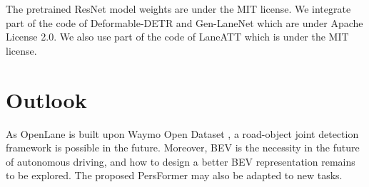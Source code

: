 \documentclass[runningheads]{llncs}
\begin{document}
The pretrained ResNet model weights are under the MIT license. We integrate part of the code of Deformable-DETR \cite{zhu2021deformable} and Gen-LaneNet \cite{guo2020gen} which are under Apache License 2.0. We also use part of the code of LaneATT \cite{tabelini2021keep} which is under the MIT license.

\section{Outlook}


As OpenLane is built upon Waymo Open Dataset \cite{sun2020scalability}, a road-object joint detection framework is possible in the future. 
Moreover, BEV is the necessity in the future of autonomous driving, and how to design a better BEV representation remains to be explored. The proposed PersFormer may also be adapted to new tasks.  
\end{document}
